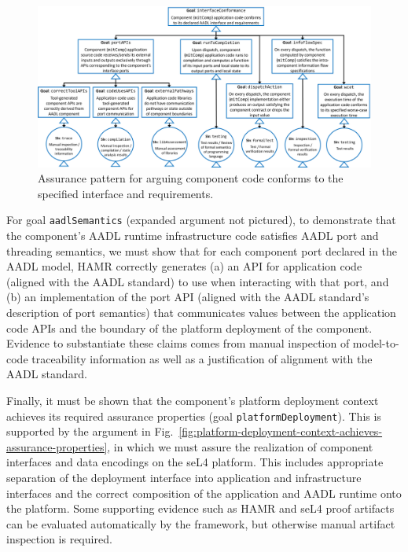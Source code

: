 \begin{figure}[h]
	\centering 
	\includegraphics[width=\textwidth]{figs/code-conforms-to-interface-and-requirements.png}
	\caption{Assurance pattern for arguing component code conforms to the specified interface and requirements.}
	\label{fig:code-conforms-to-interface-and-requirements} 
\end{figure}
\vspace{-3mm}

For goal \texttt{aadlSemantics} (expanded argument not pictured), to demonstrate that the component's AADL runtime infrastructure code satisfies AADL port and threading semantics, we must show that for each component port declared in the AADL model, HAMR correctly generates (a) an API for application code (aligned with the AADL standard) to use when interacting with that port,
and (b) an implementation of the port API (aligned with the AADL standard's description of port semantics) that communicates values between the application code APIs and the boundary of the platform deployment of the component.  Evidence to substantiate these claims comes from manual inspection of model-to-code traceability information as well as a justification of alignment with the AADL standard.

Finally, it must be shown that the component's platform deployment context achieves its required assurance properties (goal \texttt{platformDeployment}).  This is supported by the argument in Fig.~\ref{fig:platform-deployment-context-achieves-assurance-properties}, in which we must assure the realization of component interfaces and data encodings on the seL4 platform.  This includes appropriate separation of the deployment interface into application and infrastructure interfaces and the correct composition of the application and AADL runtime onto the platform.  Some supporting evidence such as HAMR and seL4 proof artifacts can be evaluated automatically by the framework, but otherwise manual artifact inspection is required.

